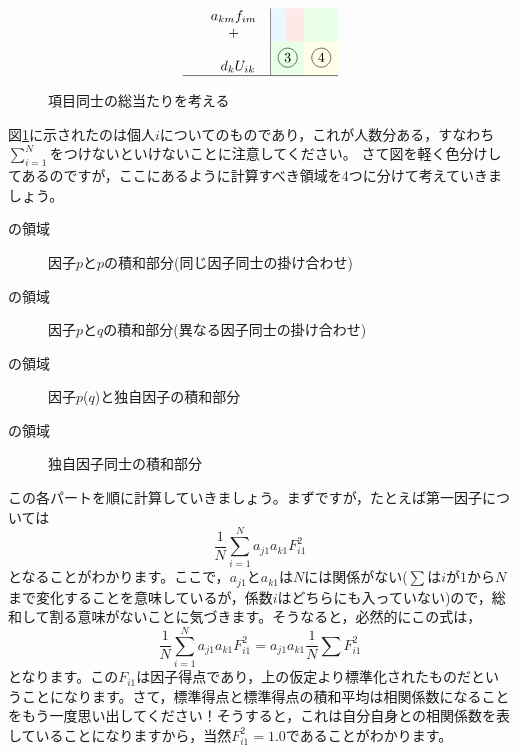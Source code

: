 \documentclass{ltjsbook}
\begin{document}
\begin{figure}[ht]
\[\begin{array}{rl|cccccc|}
			        & \begin{array}{c}a_{km}f_{im}\\+\end{array}             & \multicolumn{4}{>{\columncolor{cyan!9}}c}{}             & \multicolumn{1}{>{\columncolor{red!9}}c}{}               & \multicolumn{1}{>{\columncolor{green!9}}c}{}                                                                                                  \\
			        & \hspace{7pt}\begin{array}{c}\\ d_kU_{ik}\\ \end{array} & \multicolumn{5}{>{\columncolor{green!9}}c}{\circled{3}} & \multicolumn{1}{>{\columncolor{yellow!9}}c}{\circled{4}}                                                                                                                                                 \\\hline
		\end{array}
	\]
	\caption{項目同士の総当たりを考える}
	\label{x03_multiply}
\end{figure}

図\ref{x03_multiply}に示されたのは個人$i$についてのものであり，これが人数分ある，すなわち$\sum_{i=1}^N$をつけないといけないことに注意してください。
さて図を軽く色分けしてあるのですが，ここにあるように計算すべき領域を4つに分けて考えていきましょう。
\begin{description}
	\item[の領域] 因子$p$と$p$の積和部分(同じ因子同士の掛け合わせ)
	\item[の領域] 因子$p$と$q$の積和部分(異なる因子同士の掛け合わせ)
	\item[の領域] 因子$p$($q$)と独自因子の積和部分
	\item[の領域] 独自因子同士の積和部分
\end{description}

この各パートを順に計算していきましょう。まずですが，たとえば第一因子については
\begin{equation}
	\frac{1}{N}\sum_{i=1}^{N}a_{j1}a_{k1}F_{i1}^2
\end{equation}
となることがわかります。ここで，$a_{j1}$と$a_{k1}$は$N$には関係がない($\sum$は$i$が$1$から$N$まで変化することを意味しているが，係数$i$はどちらにも入っていない)ので，総和して割る意味がないことに気づきます。そうなると，必然的にこの式は，
\begin{equation}
	\frac{1}{N}\sum_{i=1}^{N}a_{j1}a_{k1}F_{i1}^2=a_{j1}a_{k1}\frac{1}{N}\sum F_{i1}^2
\end{equation}
となります。この$F_{i1}$は因子得点であり，上の仮定より標準化されたものだということになります。さて，標準得点と標準得点の積和平均は相関係数になることをもう一度思い出してください！そうすると，これは自分自身との相関係数を表していることになりますから，当然$F_{i1}^2=1.0$であることがわかります。
\end{document}
